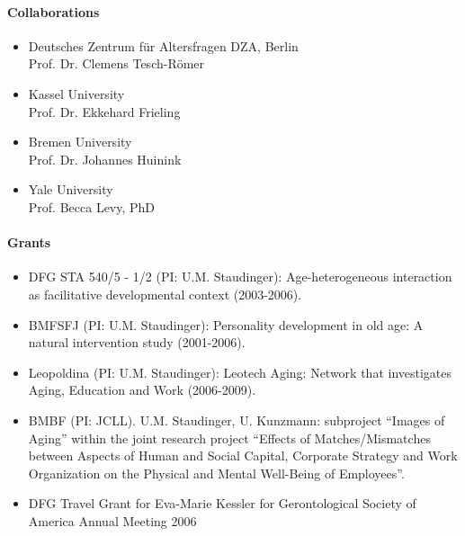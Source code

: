 \paragraph{Collaborations}

\begin{itemize}
\item Deutsches Zentrum f\"ur Altersfragen DZA, Berlin\\ Prof. Dr. Clemens Tesch-R\"omer
\item Kassel University\\ Prof. Dr. Ekkehard Frieling 
\item Bremen University\\ Prof. Dr. Johannes Huinink
\item Yale University\\ Prof. Becca Levy, PhD
\end{itemize}

\begin{bibunit}[apalike]
\nocite{*}
\putbib[profUrsulaStaudinger3]
\end{bibunit}

\enlargethispage{2cm}
\paragraph{Grants}
\begin{itemize}
\item DFG STA 540/5 - 1/2 (PI: U.M. Staudinger): Age-heterogeneous interaction as facilitative developmental context (2003-2006).
\item BMFSFJ (PI: U.M. Staudinger): Personality development in old age: A natural intervention study (2001-2006).
\item Leopoldina (PI: U.M. Staudinger): Leotech Aging: Network that investigates Aging, Education and Work (2006-2009).
\item BMBF (PI: JCLL). U.M. Staudinger, U. Kunzmann: subproject ``Images of Aging'' within the joint research project ``Effects of Matches/Mismatches between Aspects of Human and Social Capital, Corporate Strategy and Work Organization on the Physical and Mental Well-Being of Employees''. 
\item DFG Travel Grant for Eva-Marie Kessler for Gerontological Society of America Annual Meeting 2006
\end{itemize}
